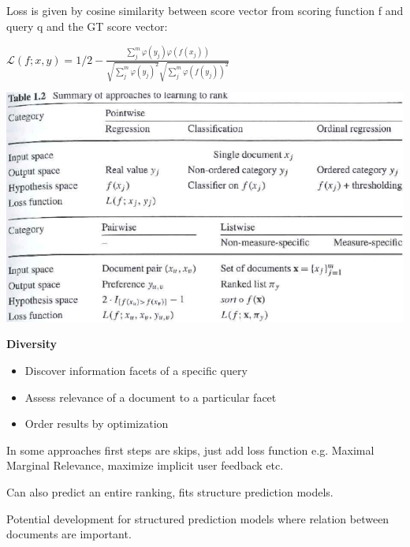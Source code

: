 \documentclass[a4paper,10pt,landscape]{article}
\begin{document}
\begin{multicols}{3}
Loss is given by cosine similarity between score vector from scoring function f and query q and the GT score vector:

$\mathcal{L}(f;x,y) = 1/2 - \frac{\sum_j^m\varphi(y_j)\varphi(f(x_j))}{\sqrt{\sum_j^m\varphi(y_j)^2}\sqrt{\sum_j^m\varphi(f(y_j))^2}}$

\includegraphics[width=\linewidth]{images/learningtoranksummary.png}

\textbf{Diversity}

\begin{itemize}
    \item Discover information facets of a specific query
    \item Assess relevance of a document to a particular facet
    \item Order results by optimization
\end{itemize}

In some approaches first steps are skips, just add loss function e.g. Maximal Marginal Relevance, maximize implicit user feedback etc.

Can also predict an entire ranking, fits structure prediction models.

Potential development for structured prediction models where relation between documents are important.

\end{multicols}
\end{document}
